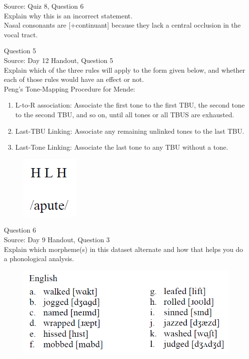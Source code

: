 \documentclass[12pt]{article}
\begin{document}
Source: Quiz 8, Question 6\\

Explain why this is an incorrect statement.\\

Nasal consonants are {[+continuant]} because they lack a central occlusion in the vocal tract.


\newpage

{\large Question 5}\\

Source: Day 12 Handout, Question 5\\

Explain which of the three rules will apply to the form given below, and whether each of those rules would have an effect or not.\\

Peng’s Tone-Mapping Procedure for Mende: \begin{enumerate} \item L-to-R association: Associate the first tone to the first TBU, the second tone to the second TBU, and so on, until all tones or all TBUS are exhausted. \item Last-TBU Linking: Associate any remaining unlinked tones to the last TBU. \item Last-Tone Linking: Associate the last tone to any TBU without a tone. \end{enumerate}

\begin{figure}[H]
\includegraphics{../images/mendetone_a.png}
\end{figure}

\newpage

{\large Question 6}\\

Source: Day 9 Handout, Question 3\\

Explain which morpheme(s) in this dataset alternate and how that helps you do a phonological analysis.\\

\begin{figure}[H]
\includegraphics{../images/english_past.png}
\end{figure}
\end{document}
